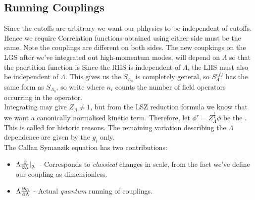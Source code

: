 \documentclass{article}
\begin{document}
\subsection{Running Couplings}
Since the cutoffs are arbitrary we want our phhysics to be independent of cutoffs. Hence we require
Correlation functions obtained using either side must be the same. Note the couplings are different on both sides. The new coupkings on the LGS after we've integrated out high-momentum modes, will depend on $\Lambda$ so that the paertition function is 
Since the RHS is independent of $\Lambda$, the LHS must also be independent of $\Lambda$. This gives us the  
$S_{\Lambda_0}$ is completely general, so $S_\Lambda^{eff}$ has the same form as $S_{\Lambda_0}$, so write 
where $n_i$ counts the number of field operators occurring in the operator. \\
Integrating may give $Z_\Lambda \neq 1$, but from the LSZ reduction formula we know that we want a canonically normalised kinetic term. Therefore, let $\phi^r = Z_\Lambda^\frac{1}{2}\phi$ be the . This is called  for historic reasons. The remaining variation describing the $\Lambda$ dependence are given by the $g_i$ only. \\
\newline
The Callan Symanzik equation has two contributions:
\begin{itemize}
    \item $\Lambda \pd{\Lambda}|_{g_i}$ - Corresponds to \emph{classical} changes in scale, from the fact we've define our coupling as dimensionless.
    \item $\Lambda \pd[g_i]{\Lambda}$ - Actual \emph{quantum} running of couplings. 
\end{itemize}
\end{document}
